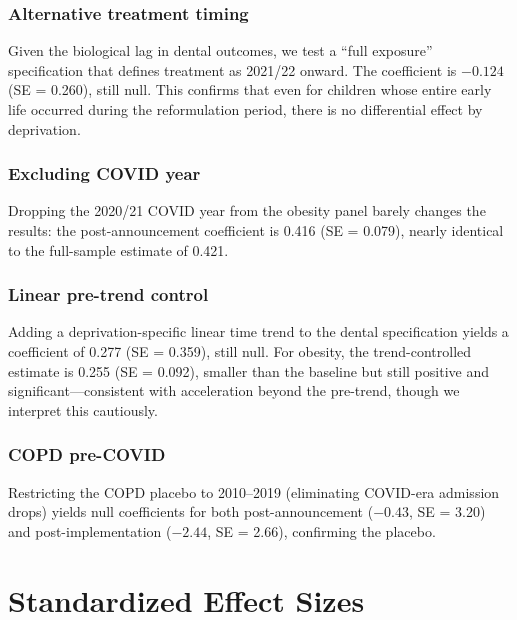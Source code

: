 \documentclass[12pt]{article}
\begin{document}
\subsubsection*{Alternative treatment timing} Given the biological lag in dental outcomes, we test a ``full exposure'' specification that defines treatment as 2021/22 onward. The coefficient is $-0.124$ (SE = 0.260), still null. This confirms that even for children whose entire early life occurred during the reformulation period, there is no differential effect by deprivation.

\subsubsection*{Excluding COVID year} Dropping the 2020/21 COVID year from the obesity panel barely changes the results: the post-announcement coefficient is 0.416 (SE = 0.079), nearly identical to the full-sample estimate of 0.421.

\subsubsection*{Linear pre-trend control} Adding a deprivation-specific linear time trend to the dental specification yields a coefficient of 0.277 (SE = 0.359), still null. For obesity, the trend-controlled estimate is 0.255 (SE = 0.092), smaller than the baseline but still positive and significant---consistent with acceleration beyond the pre-trend, though we interpret this cautiously.

\subsubsection*{COPD pre-COVID} Restricting the COPD placebo to 2010--2019 (eliminating COVID-era admission drops) yields null coefficients for both post-announcement ($-0.43$, SE = 3.20) and post-implementation ($-2.44$, SE = 2.66), confirming the placebo.

\section{Standardized Effect Sizes}
\label{sec:sde}


\end{document}
